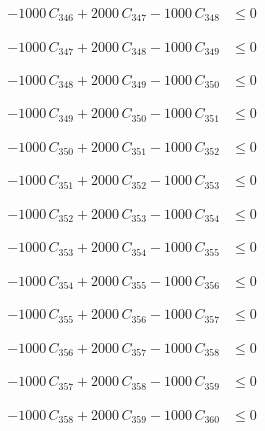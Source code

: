 \documentclass[a4paper,11pt]{article}
\begin{document}
\begin{align}
-1000\,C_{346} + 2000\,C_{347} - 1000\,C_{348} &\leq 0 \nonumber
\end{align}

\begin{align}
-1000\,C_{347} + 2000\,C_{348} - 1000\,C_{349} &\leq 0 \nonumber
\end{align}

\begin{align}
-1000\,C_{348} + 2000\,C_{349} - 1000\,C_{350} &\leq 0 \nonumber
\end{align}

\begin{align}
-1000\,C_{349} + 2000\,C_{350} - 1000\,C_{351} &\leq 0 \nonumber
\end{align}

\begin{align}
-1000\,C_{350} + 2000\,C_{351} - 1000\,C_{352} &\leq 0 \nonumber
\end{align}

\begin{align}
-1000\,C_{351} + 2000\,C_{352} - 1000\,C_{353} &\leq 0 \nonumber
\end{align}

\begin{align}
-1000\,C_{352} + 2000\,C_{353} - 1000\,C_{354} &\leq 0 \nonumber
\end{align}

\begin{align}
-1000\,C_{353} + 2000\,C_{354} - 1000\,C_{355} &\leq 0 \nonumber
\end{align}

\begin{align}
-1000\,C_{354} + 2000\,C_{355} - 1000\,C_{356} &\leq 0 \nonumber
\end{align}

\begin{align}
-1000\,C_{355} + 2000\,C_{356} - 1000\,C_{357} &\leq 0 \nonumber
\end{align}

\begin{align}
-1000\,C_{356} + 2000\,C_{357} - 1000\,C_{358} &\leq 0 \nonumber
\end{align}

\begin{align}
-1000\,C_{357} + 2000\,C_{358} - 1000\,C_{359} &\leq 0 \nonumber
\end{align}

\begin{align}
-1000\,C_{358} + 2000\,C_{359} - 1000\,C_{360} &\leq 0 \nonumber
\end{align}
\end{document}
